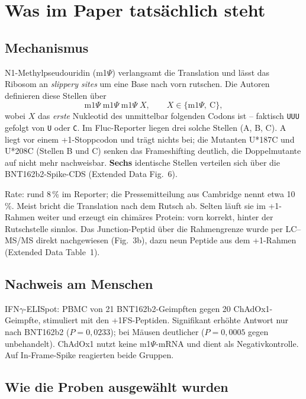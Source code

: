 \documentclass[11pt,a4paper]{article}
\begin{document}
\clearpage

\section{Was im Paper tatsächlich steht}

\subsection{Mechanismus}

N1-Methylpseudouridin (m1$\Psi$) verlangsamt die Translation und lässt das
Ribosom an \emph{slippery sites} um eine Base nach vorn rutschen. Die Autoren
definieren diese Stellen über
\[
\text{m1}\Psi\;\text{m1}\Psi\;\text{m1}\Psi\;X,
\qquad X \in \{\text{m1}\Psi,\ \text{C}\},
\]
wobei $X$ das \emph{erste} Nukleotid des unmittelbar folgenden Codons ist --
faktisch \texttt{UUU} gefolgt von \texttt{U} oder \texttt{C}. Im Fluc-Reporter
liegen drei solche Stellen (A, B, C). A liegt vor einem +1-Stoppcodon und trägt
nichts bei; die Mutanten U*187C und U*208C (Stellen B und C) senken das
Frameshifting deutlich, die Doppelmutante auf nicht mehr nachweisbar.
\textbf{Sechs} identische Stellen verteilen sich über die BNT162b2-Spike-CDS
(Extended Data Fig.~6).

Rate: rund 8\,\% im Reporter; die Pressemitteilung aus Cambridge nennt etwa
10\,\%. Meist bricht die Translation nach dem Rutsch ab. Selten läuft sie im
+1-Rahmen weiter und erzeugt ein chimäres Protein: vorn korrekt, hinter der
Rutschstelle sinnlos. Das Junction-Peptid über die Rahmengrenze wurde per
LC--MS/MS direkt nachgewiesen (Fig.~3b), dazu neun Peptide aus dem +1-Rahmen
(Extended Data Table~1).

\subsection{Nachweis am Menschen}

IFN$\gamma$-ELISpot: PBMC von 21 BNT162b2-Geimpften gegen 20
ChAdOx1-Geimpfte, stimuliert mit den +1FS-Peptiden. Signifikant erhöhte Antwort
nur nach BNT162b2 ($P = 0{,}0233$); bei Mäusen deutlicher ($P = 0{,}0005$ gegen
unbehandelt). ChAdOx1 nutzt keine m1$\Psi$-mRNA und dient als Negativkontrolle.
Auf In-Frame-Spike reagierten beide Gruppen.

\subsection{Wie die Proben ausgewählt wurden}
\end{document}

